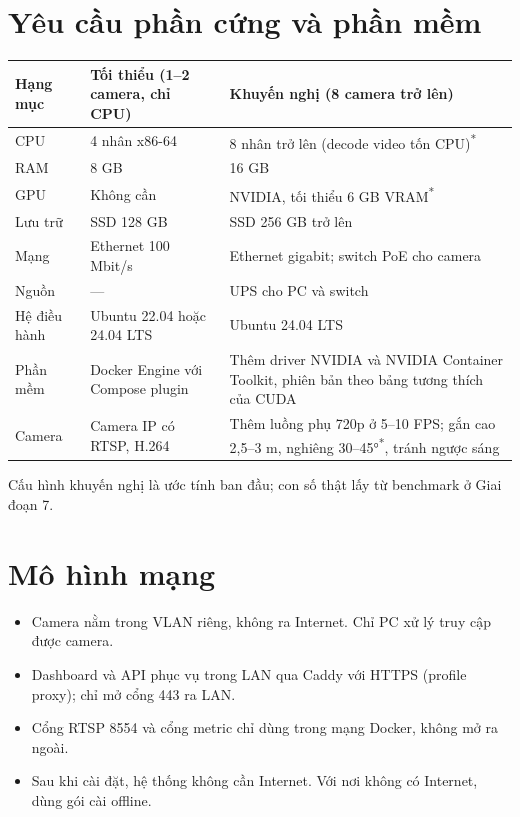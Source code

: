 \documentclass[10pt,a4paper,oneside,openany]{report}
\newcommand{\breakus}{\textunderscore\allowbreak}
\newcommand{\code}[1]{{\ttfamily\let\_\breakus #1}}
\newcommand{\uoc}{\textsuperscript{\textcolor{warn}{*}}}  %
\newcommand{\tabhead}[1]{\textsf{\bfseries\color{ink}#1}}
\newenvironment{bang}{\par\small\rowcolors{2}{rowgray}{white}}{\par\vspace{0.3em}}
\begin{document}
\section{Yêu cầu phần cứng và phần mềm}
\begin{bang}
\begin{xltabular}{\linewidth}{L{26mm}L{50mm}Y}
\toprule
\tabhead{Hạng mục} & \tabhead{Tối thiểu (1--2 camera, chỉ CPU)} & \tabhead{Khuyến nghị (8 camera trở lên)} \\
\midrule
\endhead
CPU & 4 nhân x86-64 & 8 nhân trở lên (decode video tốn CPU)\uoc \\
RAM & 8 GB & 16 GB \\
GPU & Không cần & NVIDIA, tối thiểu 6 GB VRAM\uoc \\
Lưu trữ & SSD 128 GB & SSD 256 GB trở lên \\
Mạng & Ethernet 100 Mbit/s & Ethernet gigabit; switch PoE cho camera \\
Nguồn & — & UPS cho PC và switch \\
Hệ điều hành & Ubuntu 22.04 hoặc 24.04 LTS & Ubuntu 24.04 LTS \\
Phần mềm & Docker Engine với Compose plugin & Thêm driver NVIDIA và NVIDIA Container Toolkit, phiên bản theo bảng tương thích của CUDA \\
Camera & Camera IP có RTSP, H.264 & Thêm luồng phụ 720p ở 5--10 FPS; gắn cao 2,5--3 m, nghiêng 30--45°\uoc, tránh ngược sáng \\
\bottomrule
\end{xltabular}
\end{bang}
Cấu hình khuyến nghị là ước tính ban đầu; con số thật lấy từ benchmark ở Giai đoạn 7.

\section{Mô hình mạng}
\begin{itemize}
  \item Camera nằm trong VLAN riêng, không ra Internet. Chỉ PC xử lý truy cập được camera.
  \item Dashboard và API phục vụ trong LAN qua Caddy với HTTPS (profile \code{proxy}); chỉ mở cổng 443 ra LAN.
  \item Cổng RTSP 8554 và cổng metric chỉ dùng trong mạng Docker, không mở ra ngoài.
  \item Sau khi cài đặt, hệ thống không cần Internet. Với nơi không có Internet, dùng gói cài offline.
\end{itemize}
\end{document}

